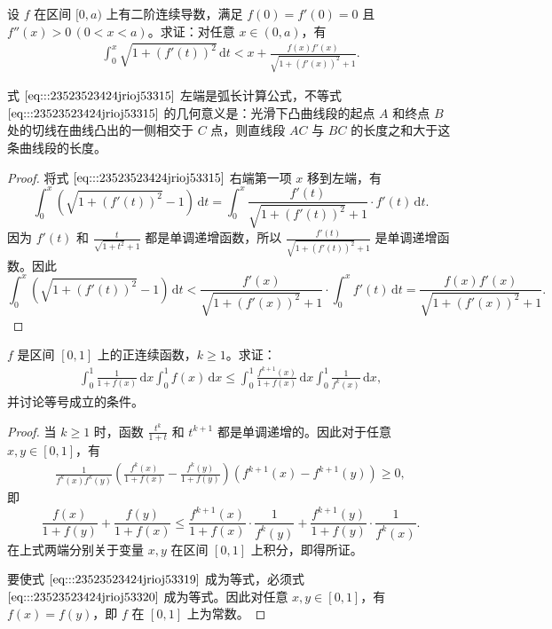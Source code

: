 \documentclass[../../main.tex]{subfiles}%
\begin{document}
\begin{proposition}
设 \( f \) 在区间 \([0,a)\) 上有二阶连续导数，满足 \( f(0) = f'(0) = 0 \) 且 \( f''(x) > 0 \, (0 < x < a) \)。求证：对任意 \( x \in (0,a) \)，有
\begin{align}
\int_{0}^{x} \sqrt{1 + (f'(t))^2} \, \mathrm{d}t < x + \frac{f(x)f'(x)}{\sqrt{1 + (f'(x))^2} + 1}. \label{eq:::23523523424jrioj53315}
\end{align}
\end{proposition}
\begin{remark}
式 \(\eqref{eq:::23523523424jrioj53315}\) 左端是弧长计算公式，不等式 \(\eqref{eq:::23523523424jrioj53315}\) 的几何意义是：光滑下凸曲线段的起点 \( A \) 和终点 \( B \) 处的切线在曲线凸出的一侧相交于 \( C \) 点，则直线段 \( AC \) 与 \( BC \) 的长度之和大于这条曲线段的长度。
\end{remark}
\begin{proof}
将式 \(\eqref{eq:::23523523424jrioj53315}\) 右端第一项 \( x \) 移到左端，有
\[
\int_{0}^{x} \left( \sqrt{1 + (f'(t))^2} - 1 \right) \, \mathrm{d}t = \int_{0}^{x} \frac{f'(t)}{\sqrt{1 + (f'(t))^2} + 1} \cdot f'(t) \, \mathrm{d}t.
\]
因为 \( f'(t) \) 和 \( \frac{t}{\sqrt{1 + t^2} + 1} \) 都是单调递增函数，所以 \( \frac{f'(t)}{\sqrt{1 + (f'(t))^2} + 1} \) 是单调递增函数。因此
\[
\int_{0}^{x} \left( \sqrt{1 + (f'(t))^2} - 1 \right) \, \mathrm{d}t < \frac{f'(x)}{\sqrt{1 + (f'(x))^2} + 1} \cdot \int_{0}^{x} f'(t) \, \mathrm{d}t = \frac{f(x)f'(x)}{\sqrt{1 + (f'(x))^2} + 1}.
\]
\end{proof}

\begin{example}
\( f \) 是区间 \([0,1]\) 上的正连续函数，\( k \geqslant 1 \)。求证：
\begin{align}
\int_{0}^{1} \frac{1}{1 + f(x)} \, \mathrm{d}x \int_{0}^{1} f(x) \, \mathrm{d}x \leqslant \int_{0}^{1} \frac{f^{k + 1}(x)}{1 + f(x)} \, \mathrm{d}x \int_{0}^{1} \frac{1}{f^k(x)} \, \mathrm{d}x, \label{eq:::23523523424jrioj53319}
\end{align}
并讨论等号成立的条件。
\end{example}
\begin{proof}
当 \( k \geqslant 1 \) 时，函数 \( \frac{t^k}{1 + t} \) 和 \( t^{k + 1} \) 都是单调递增的。因此对于任意 \( x, y \in [0,1] \)，有
\begin{align}
\frac{1}{f^k(x)f^k(y)} \left( \frac{f^k(x)}{1 + f(x)} - \frac{f^k(y)}{1 + f(y)} \right) \left( f^{k + 1}(x) - f^{k + 1}(y) \right) \geqslant 0, \label{eq:::23523523424jrioj53320}
\end{align}
即
\[
\frac{f(x)}{1 + f(y)} + \frac{f(y)}{1 + f(x)} \leqslant \frac{f^{k + 1}(x)}{1 + f(x)} \cdot \frac{1}{f^k(y)} + \frac{f^{k + 1}(y)}{1 + f(y)} \cdot \frac{1}{f^k(x)}.
\]
在上式两端分别关于变量 \( x, y \) 在区间 \([0,1]\) 上积分，即得所证。

要使式 \(\eqref{eq:::23523523424jrioj53319}\) 成为等式，必须式 \(\eqref{eq:::23523523424jrioj53320}\) 成为等式。因此对任意 \( x, y \in [0,1] \)，有 \( f(x) = f(y) \)，即 \( f \) 在 \([0,1]\) 上为常数。
\end{proof}
\end{document}
